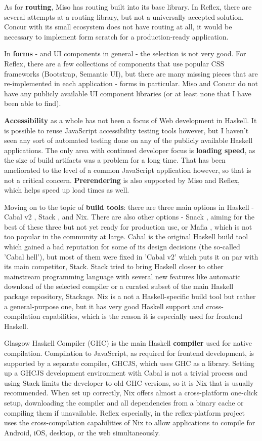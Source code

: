 \documentclass[english,odsaz]{fitthesis}
\begin{document}
As for \textbf{routing}, Miso has routing built into its base library. In Reflex, there
are several attempts at a routing library, but not a universally accepted
solution. Concur with its small ecosystem does not have routing at all, it would
be necessary to implement form scratch for a production-ready application.

In \textbf{forms} - and UI components in general - the selection is not very good. For
Reflex, there are a few collections of components that use popular CSS
frameworks (Bootstrap, Semantic UI), but there are many missing pieces that are
re-implemented in each application - forms in particular. Miso and Concur do not
have any publicly available UI component libraries (or at least none that I have
been able to find).

\textbf{Accessibility} as a whole has not been a focus of Web development in Haskell. It
is possible to reuse JavaScript accessibility testing tools however, but I
haven't seen any sort of automated testing done on any of the publicly available
Haskell applications. The only area with continued developer focus is \textbf{loading
speed}, as the size of build artifacts was a problem for a long time. That has
been ameliorated to the level of a common JavaScript application however, so
that is not a critical concern. \textbf{Prerendering} is also supported by Miso and
Reflex, which helps speed up load times as well.

Moving on to the topic of \textbf{build tools}: there are three main options in Haskell -
Cabal v2 \cite{cabal}, Stack \cite{stack}, and Nix. There are also
other options - Snack \cite{snack}, aiming for the best of these three but not
yet ready for production use, or Mafia \cite{mafia}, which is not too popular in
the community at large. Cabal is the original Haskell build tool which gained a
bad reputation for some of its design decisions (the so-called 'Cabal hell'),
but most of them were fixed in 'Cabal v2' which puts it on par with its main
competitor, Stack. Stack tried to bring Haskell closer to other mainstream
programming language with several new features like automatic download of the
selected compiler or a curated subset of the main Haskell package repository,
Stackage. Nix is a not a Haskell-specific build tool but rather a
general-purpose one, but it has very good Haskell support and cross-compilation
capabilities, which is the reason it is especially used for frontend Haskell.

Glasgow Haskell Compiler (GHC) is the main Haskell \textbf{compiler} used for native
compilation. Compilation to JavaScript, as required for frontend development, is
supported by a separate compiler, GHCJS, which uses GHC as a library. Setting up
a GHCJS development environment with Cabal is not a trivial process and using
Stack limits the developer to old GHC versions, so it is Nix that is usually
recommended. When set up correctly, Nix offers almost a cross-platform one-click
setup, downloading the compiler and all dependencies from a binary cache or
compiling them if unavailable. Reflex especially, in the reflex-platform
\cite{reflex-platform} project uses the cross-compilation capabilities of Nix to
allow applications to compile for Android, iOS, desktop, or the web
simultaneously.
\end{document}

